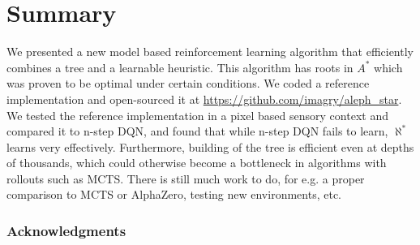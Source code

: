 \documentclass{article}
\newcommand{\alephstar}{$\aleph^*$ }
\newcommand{\astar}{$A^*$ }
\begin{document}
\section{Summary}
\label{sec:summary}

We presented a new model based reinforcement learning algorithm that efficiently combines a tree and a learnable heuristic. This algorithm has roots in \astar which was proven to be optimal under certain conditions. We coded a reference implementation and open-sourced it at \url{https://github.com/imagry/aleph_star}. We tested the reference implementation in a pixel based sensory context and compared it to n-step DQN, and found that while n-step DQN fails to learn, \alephstar learns very effectively. Furthermore, building of the tree is efficient even at depths of thousands, which could otherwise become a bottleneck in algorithms with rollouts such as MCTS. There is still much work to do, for e.g. a proper comparison to MCTS or AlphaZero, testing new environments, etc.

\subsubsection*{Acknowledgments}




{

\small

}
\end{document}
